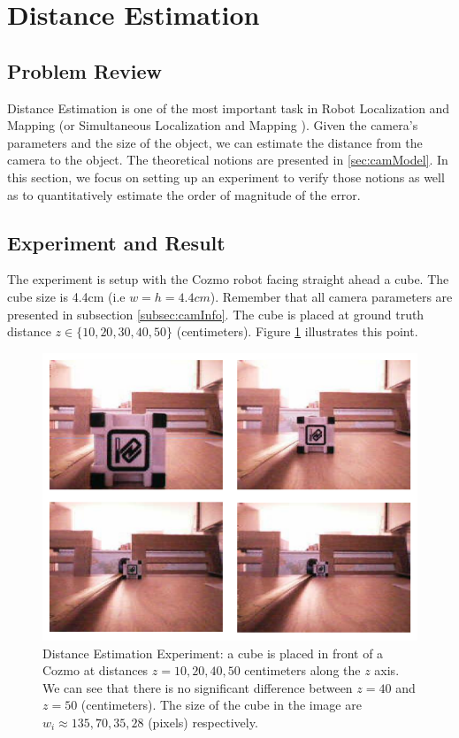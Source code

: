 \section{Distance Estimation}
\label{sec:distEstimExp}
\subsection{Problem Review}
Distance Estimation is one of the most important task in Robot Localization and Mapping (or Simultaneous Localization and Mapping \cite{wiki:SLAM}). Given the camera's parameters and the size of the object, we can estimate the distance from the camera to the object. The theoretical notions are presented in \ref{sec:camModel}. In this section, we focus on setting up an experiment to verify those notions as well as to quantitatively estimate the order of magnitude of the error.

\subsection{Experiment and Result}
The experiment is setup with the Cozmo robot facing straight ahead a cube. The cube size is 4.4cm (i.e $w = h = 4.4cm$). Remember that all camera parameters are presented in subsection \ref{subsec:camInfo}. The cube is placed at ground truth distance $z \in \{10, 20, 30, 40, 50\}$ (centimeters). Figure \ref{fig:distEstim} illustrates this point. 

\begin{figure}[tb]
	\centering
	\includegraphics[width=0.6\hsize]{./figures/distEstim}
	\caption{Distance Estimation Experiment: a cube is placed in front of a Cozmo at distances $z = {10, 20, 40, 50}$ centimeters along the $z$ axis. We can see that there is no significant difference between $z = 40$ and $z = 50$ (centimeters). The size of the cube in the image are $w_i \approx {135, 70, 35, 28}$ (pixels) respectively.}
	\label{fig:distEstim}
\end{figure}

